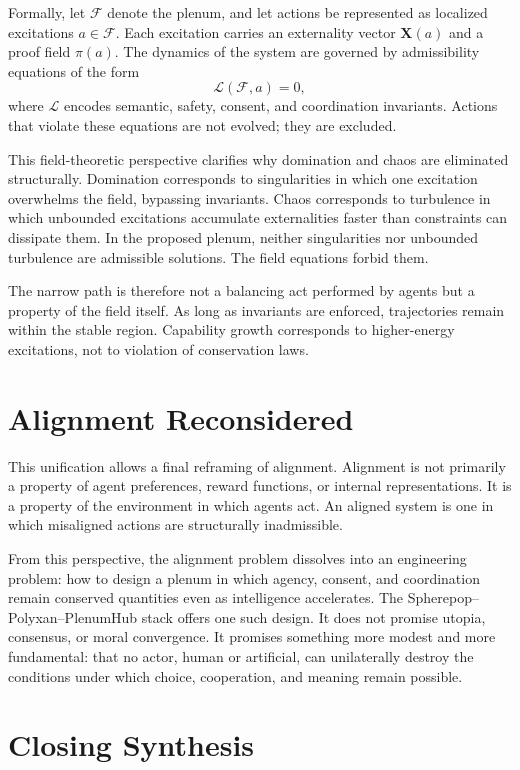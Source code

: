 \documentclass[11pt,oneside]{article}
\begin{document}
Formally, let \( \mathcal{F} \) denote the plenum, and let actions be represented as localized excitations \( a \in \mathcal{F} \). Each excitation carries an externality vector \( \mathbf{X}(a) \) and a proof field \( \pi(a) \). The dynamics of the system are governed by admissibility equations of the form
\[
\mathcal{L}(\mathcal{F}, a) = 0,
\]
where \( \mathcal{L} \) encodes semantic, safety, consent, and coordination invariants. Actions that violate these equations are not evolved; they are excluded.

This field-theoretic perspective clarifies why domination and chaos are eliminated structurally. Domination corresponds to singularities in which one excitation overwhelms the field, bypassing invariants. Chaos corresponds to turbulence in which unbounded excitations accumulate externalities faster than constraints can dissipate them. In the proposed plenum, neither singularities nor unbounded turbulence are admissible solutions. The field equations forbid them.

The narrow path is therefore not a balancing act performed by agents but a property of the field itself. As long as invariants are enforced, trajectories remain within the stable region. Capability growth corresponds to higher-energy excitations, not to violation of conservation laws.

\section{Alignment Reconsidered}

This unification allows a final reframing of alignment. Alignment is not primarily a property of agent preferences, reward functions, or internal representations. It is a property of the environment in which agents act. An aligned system is one in which misaligned actions are structurally inadmissible.

From this perspective, the alignment problem dissolves into an engineering problem: how to design a plenum in which agency, consent, and coordination remain conserved quantities even as intelligence accelerates. The Spherepop–Polyxan–PlenumHub stack offers one such design. It does not promise utopia, consensus, or moral convergence. It promises something more modest and more fundamental: that no actor, human or artificial, can unilaterally destroy the conditions under which choice, cooperation, and meaning remain possible.

\section{Closing Synthesis}
\end{document}
